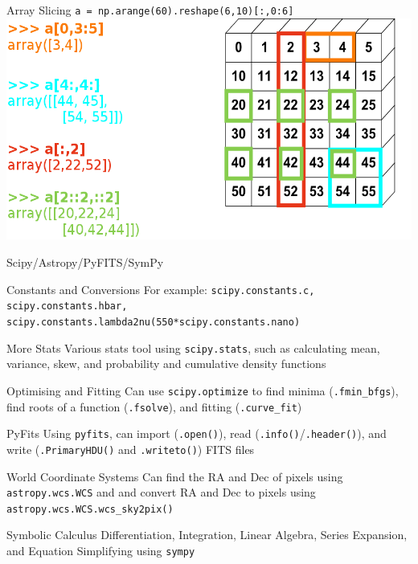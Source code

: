 \documentclass{beamer}
\begin{document}
\begin{frame}{Array Slicing}
    \texttt{a = np.arange(60).reshape(6,10)[:,0:6]} \\
    \includegraphics[scale=0.45]{slicing.png}
\end{frame}

\begin{frame}{Scipy/Astropy/PyFITS/SymPy}
  \fontsize{8pt}{8}\selectfont
  \begin{block}{Constants and Conversions}
     For example: \texttt{scipy.constants.c, scipy.constants.hbar, scipy.constants.lambda2nu(550*scipy.constants.nano)}
  \end{block}
  \begin{block}{More Stats}
     Various stats tool using \texttt{scipy.stats}, such as calculating mean, variance, skew, and probability and cumulative density functions
  \end{block}
  \begin{block}{Optimising and Fitting}
      Can use \texttt{scipy.optimize} to find minima (\texttt{.fmin\_bfgs}), find roots of a function (\texttt{.fsolve}), and fitting (\texttt{.curve\_fit})
  \end{block}  
  \begin{block}{PyFits}
      Using \texttt{pyfits}, can import (\texttt{.open()}), read (\texttt{.info()}/\texttt{.header()}), and write (\texttt{.PrimaryHDU()} and \texttt{.writeto()}) FITS files 
  \end{block}  
  \begin{block}{World Coordinate Systems}
      Can find the RA and Dec of pixels using \texttt{astropy.wcs.WCS} and and convert RA and Dec to pixels using \texttt{astropy.wcs.WCS.wcs\_sky2pix()}
  \end{block}
  \begin{block}{Symbolic Calculus}
    Differentiation, Integration, Linear Algebra, Series Expansion, and Equation Simplifying using \texttt{sympy}
  \end{block}
\end{frame}
\end{document}
